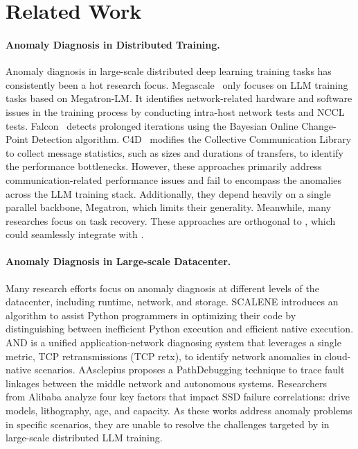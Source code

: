 \section{Related Work}
\paragraph{Anomaly Diagnosis in Distributed Training. }

Anomaly diagnosis in large-scale distributed deep learning training tasks has consistently been a hot research focus\cite{jiangMegaScaleScaling, wuFALCONPinpointing, dongBoostingLargescale, peng2018optimus, haider2011fault, chen2020elastic}. Megascale~\cite{jiangMegaScaleScaling} only focuses on LLM training tasks based on Megatron-LM. It identifies network-related hardware and software issues in the training process by conducting intra-host network tests and NCCL tests. Falcon~\cite{wuFALCONPinpointing} detects prolonged iterations using the Bayesian Online Change-Point Detection algorithm.
C4D~\cite{dongBoostingLargescale} modifies the Collective Communication Library to collect message statistics, such as sizes and durations of transfers, to identify the performance bottlenecks. However, these approaches primarily address communication-related performance issues and fail to encompass the anomalies across the LLM training stack.
Additionally, they depend heavily on a single parallel backbone, Megatron, which limits their generality.
Meanwhile, many researches\cite{peng2018optimus, haider2011fault, chen2020elastic} focus on task recovery. These approaches are orthogonal to \sysname{}, which could seamlessly integrate with \sysname{}.

\paragraph{Anomaly Diagnosis in Large-scale Datacenter. }

Many research efforts\cite{bergerTriangulatingPython, wangDiagnosingApplicationnetwork,yangAAsclepiusMonitoring , han2021depth, wangZeroOverhead} focus on anomaly diagnosis at different levels of the datacenter, including runtime, network, and storage.
SCALENE\cite{bergerTriangulatingPython} introduces an algorithm to assist Python programmers in optimizing their code by distinguishing between inefficient Python execution and efficient native execution.
AND\cite{wangDiagnosingApplicationnetwork} is a unified application-network diagnosing system that leverages a single metric, TCP retransmissions (TCP retx), to identify network anomalies in cloud-native scenarios.
AAsclepius\cite{yangAAsclepiusMonitoring} proposes a PathDebugging technique to trace fault linkages between the middle network and autonomous systems.
Researchers~\cite{han2021depth} from Alibaba analyze four key factors that impact SSD failure correlations: drive models, lithography, age, and capacity.
As these works address anomaly problems in specific scenarios, they are unable to resolve the challenges targeted by \sysname{} in large-scale distributed LLM training.